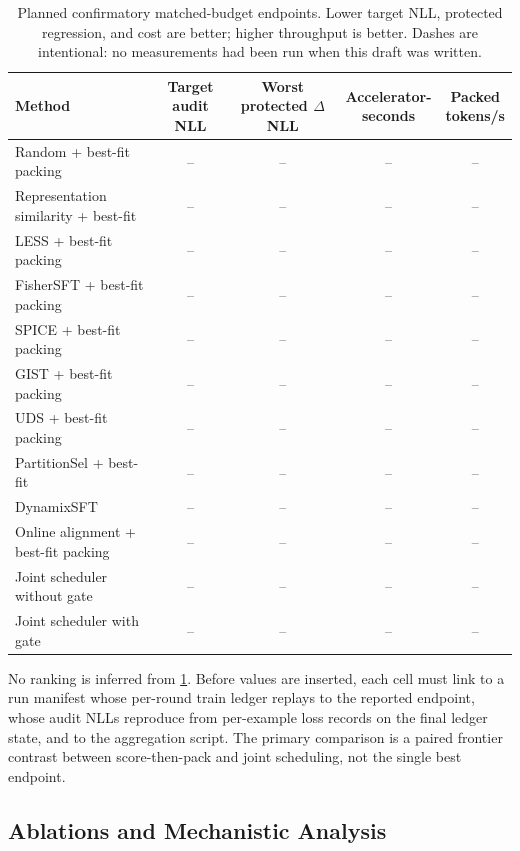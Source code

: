 \documentclass{article}
\begin{document}
\begin{table}[t]
\caption{Planned confirmatory matched-budget endpoints. Lower target NLL, protected
regression, and cost are better; higher throughput is better. Dashes are
intentional: no measurements had been run when this draft was written.}
\label{tab:main}
\centering
\begin{small}
\begin{tabular}{lcccc}
\toprule
Method & \shortstack{Target audit\\NLL}
& \shortstack{Worst protected\\$\Delta$NLL}
& \shortstack{Accelerator-\\seconds}
& \shortstack{Packed\\tokens/s} \\
\midrule
Random + best-fit packing & -- & -- & -- & -- \\
Representation similarity + best-fit & -- & -- & -- & -- \\
LESS + best-fit packing & -- & -- & -- & -- \\
FisherSFT + best-fit packing & -- & -- & -- & -- \\
SPICE + best-fit packing & -- & -- & -- & -- \\
GIST + best-fit packing & -- & -- & -- & -- \\
UDS + best-fit packing & -- & -- & -- & -- \\
PartitionSel + best-fit & -- & -- & -- & -- \\
DynamixSFT & -- & -- & -- & -- \\
Online alignment + best-fit packing & -- & -- & -- & -- \\
Joint scheduler without gate & -- & -- & -- & -- \\
Joint scheduler with gate & -- & -- & -- & -- \\
\bottomrule
\end{tabular}
\end{small}
\end{table}

No ranking is inferred from \cref{tab:main}. Before values are inserted, each
cell must link to a run manifest whose per-round train ledger replays to the
reported endpoint, whose audit NLLs reproduce from per-example loss records on
the final ledger state, and to the aggregation script. The primary
comparison is a paired frontier contrast between score-then-pack and joint
scheduling, not the single best endpoint.

\subsection{Ablations and Mechanistic Analysis}
\end{document}
